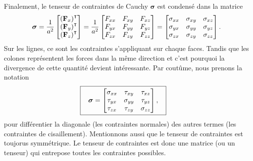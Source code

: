 \documentclass[10pt]{article}
\numberwithin{equation}{section}
\begin{document}
Finalement, le tenseur de contraintes de Cauchy \(\boldsymbol{\sigma}\) est condensé dans la matrice
\begin{equation}
   \boldsymbol{\sigma} = \frac{1}{a^2}
   \begin{bmatrix}
     \qty(\vb{F}_x)^\intercal\\
     \qty(\vb{F}_y)^\intercal\\
     \qty(\vb{F}_z)^\intercal\\
   \end{bmatrix}
   =
   \frac{1}{a^2}
   \begin{bmatrix}
     F_{xx} & F_{xy} & F_{xz} \\
     F_{yx} & F_{yy} & F_{yz} \\
     F_{zx} & F_{zy} & F_{zz} \\
   \end{bmatrix}
   =
   \begin{bmatrix}
     \sigma_{xx} & \sigma_{xy} & \sigma_{xz} \\
     \sigma_{yx} & \sigma_{yy} & \sigma_{yz} \\
     \sigma_{zx} & \sigma_{zy} & \sigma_{zz} \\
   \end{bmatrix}.
\end{equation}
Sur les lignes, ce sont les contraintes s'appliquant sur chaque faces.
Tandis que les colones représentent les forces dans la même direction et c'est pourquoi la divergence de cette quantité devient intéressante. 
Par coutûme, nous prenons la notation
\begin{align}
\label{eq:org8e2ae52}
   &\boxed{\hspace{0.3cm}\boldsymbol{\sigma} =
   \begin{bmatrix}
     \sigma_{xx} & \tau_{xy} & \tau_{xz} \\
     \tau_{yx} & \sigma_{yy} & \tau_{yz} \\
     \tau_{zx} & \tau_{zy} & \sigma_{zz} \\
   \end{bmatrix},\hspace{0.3cm}}
\end{align}
pour différentier la diagonale (les contraintes normales) des autres termes (les contraintes de cisaillement).
Mentionnons aussi que le tenseur de contraintes est toujorus symmétrique.
Le tenseur de contraintes est donc une matrice (ou un tenseur) qui entrepose toutes les contraintes possibles. \bigskip
\end{document}
